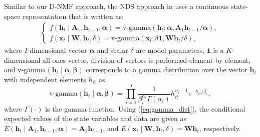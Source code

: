 \documentclass[10pt,twocolumn,twoside] {IEEEtran}
\begin{document}
Similar to our D-NMF approach, the NDS approach in \cite{Fevotte2013} uses
a continuous state-space representation that is written as:
\begin{multline}
\left\{ \begin{array}{ll}
f\left(\mathbf{h}_{t}\mid\mathbf{A}_{1},\mathbf{h}_{t-1},\boldsymbol{\alpha}\right)=\text{v-gamma}\left(\mathbf{h}_{t};\boldsymbol{\alpha},\mathbf{A}_{1}\mathbf{h}_{t-1}/\boldsymbol{\alpha}\right),\\
f\left(\mathbf{x}_{t}\mid\mathbf{W},\mathbf{h}_{t},\delta\right)=\text{v-gamma}\left(\mathbf{x}_{t};\delta\boldsymbol{1},\mathbf{W}\mathbf{h}_{t}/\delta\right),
\end{array}\right.\label{eq:state-space-rep-nds}
\end{multline}
where $I$-dimensional vector $\boldsymbol{\alpha}$ and scalar
$\delta$ are model parameters, $\boldsymbol{1}$ is a $K$-dimensional
all-ones-vector, division of vectors is performed element by element,
and $\text{v-gamma}\left(\mathbf{h}_{t}\mid\boldsymbol{\alpha},\boldsymbol{\beta}\right)$
corresponds to a gamma distribution over the vector $\mathbf{h}_{t}$
with independent elements $h_{it}$ as
\begin{equation}
\text{v-gamma}\left(\mathbf{h}_{t}\mid\boldsymbol{\alpha},\boldsymbol{\beta}\right) = \prod_{i=1}^{I}\frac{1}{\beta_{i}^{\alpha_{i}}\Gamma\left(\alpha_{i}\right)}h_{it}^{\alpha_{i}-1}e^{-h_{it}/\beta_{i}},\label{eq:gamma_dist}
\end{equation}
where $\Gamma\left(\cdot\right)$ is the gamma function. Using (\ref{eq:gamma_dist}),
the conditional expected values of the state variables and data are given as $E(\mathbf{h}_{t}\mid\mathbf{A}_{1},\mathbf{h}_{t-1},\boldsymbol{\alpha})=\mathbf{A}_{1}\mathbf{h}_{t-1}$, and
$E(\mathbf{x}_{t}\mid\mathbf{W},\mathbf{h}_{t},\delta)=\mathbf{W}\mathbf{h}_{t}$, respectively.
\end{document}
